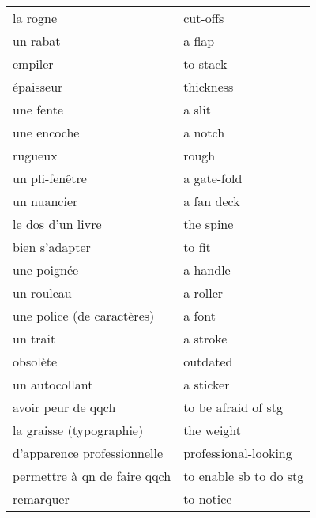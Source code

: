 \documentclass[
  10pt,
]{article}
\begin{document}
\begin{longtable}{ll}
la rogne & cut-offs\\

\rowcolor{gray!6}  un rabat & a flap\\

empiler & to stack\\

\rowcolor{gray!6}  épaisseur & thickness\\

une fente & a slit\\

\rowcolor{gray!6}  une encoche & a notch\\

rugueux & rough\\

\rowcolor{gray!6}  un pli-fenêtre & a gate-fold\\

un nuancier & a fan deck\\

\rowcolor{gray!6}  le dos d'un livre & the spine\\

bien s'adapter & to fit\\

\rowcolor{gray!6}  une poignée & a handle\\

un rouleau & a roller\\

\rowcolor{gray!6}  une police (de caractères) & a font\\

un trait & a stroke\\

\rowcolor{gray!6}  obsolète & outdated\\

un autocollant & a sticker\\

\rowcolor{gray!6}  avoir peur de qqch & to be afraid of stg\\

la graisse (typographie) & the weight\\

\rowcolor{gray!6}  d'apparence professionnelle & professional-looking\\

permettre à qn de faire qqch & to enable sb to do stg\\

\rowcolor{gray!6}  remarquer & to notice\\


\end{longtable}
\end{document}
